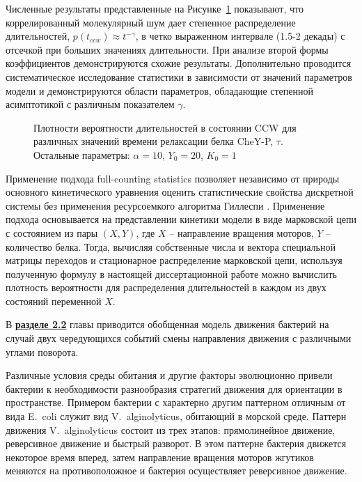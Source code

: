 Численные результаты представленные на Рисунке~\cref{fig:duration-pdf} показывают, что коррелированный молекулярный шум дает степенное распределение длительностей, $p(t_{ccw}) \approx t^{-\gamma}$, в четко выраженном интервале (1.5-2 декады) с отсечкой при больших значениях длительности. При анализе второй формы коэффициентов демонстрируются схожие результаты. Дополнительно проводится систематическое исследование статистики в зависимости от значений параметров модели и демонстрируются области параметров, обладающие степенной асимптотикой с различным показателем $\gamma$.

\begin{figure}[ht]
    \caption{
        Плотности вероятности длительностей в состоянии CCW для различных значений времени релаксации белка CheY-P, $\tau$. Остальные параметры: $\alpha = 10$, $Y_0 = 20$, $K_0 = 1$
    }
    \label{fig:duration-pdf}
\end{figure}

Применение подхода full-counting statistics позволяет независимо от природы основного кинетического уравнения оценить статистические свойства дискретной системы без применения ресурсоемкого алгоритма Гиллеспи \cite{gillespie_stochastic_2007}. Применение подхода основывается на представлении кинетики модели в виде марковской цепи с состоянием из пары $(X,Y)$, где $X$ -- направление вращения моторов, $Y$ -- количество белка. Тогда, вычисляя собственные числа и вектора специальной матрицы переходов и стационарное распределение марковской цепи, используя полученную формулу в настоящей диссертационной работе можно вычислить плотность вероятности для распределения длительностей в каждом из двух состояний переменной $X$. 

В \underline{\textbf{разделе 2.2}} главы приводится обобщенная модель движения бактерий на случай двух чередующихся событий смены направления движения с различными углами поворота. 

Различные условия среды обитания и другие факторы эволюционно привели бактерии к необходимости разнообразия стратегий движения для ориентации в пространстве. Примером бактерии с характерно другим паттерном отличным от вида E.~coli служит вид V.~alginolyticus, обитающий в морской среде. Паттерн движения V.~alginolyticus состоит из трех этапов: прямолинейное движение, реверсивное движение и быстрый разворот. В этом паттерне бактерия движется некоторое время вперед, затем направление вращения моторов жгутиков меняются на противоположное и бактерия осуществляет реверсивное движение. 

